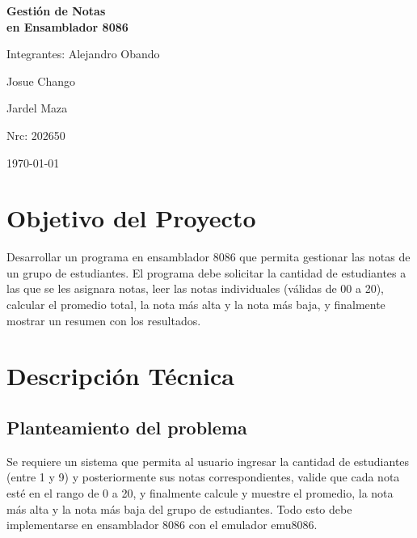 \documentclass[12pt,a4paper]{article}
\begin{document}
\begin{titlepage}
    \centering
    \vspace*{3cm}
    {\Huge \bfseries Gesti\'on de Notas\\[0.5cm]
    en Ensamblador 8086\par}
    \vspace{2cm}
    {\Large Integrantes: Alejandro Obando\par}
    {\Large                               Josue Chango\par}
    {\Large                               Jardel Maza\par}
    \vspace{1cm}
    {\Large Nrc: 202650\par}

    \vspace{2cm}
    {\large \today\par}
    \vfill
\end{titlepage}

\section{Objetivo del Proyecto}

Desarrollar un programa en ensamblador 8086 que permita gestionar las notas de un grupo de estudiantes. El programa debe solicitar la cantidad de estudiantes a las que se les asignara notas, leer las notas individuales (v\'alidas de 00 a 20), calcular el promedio total, la nota m\'as alta y la nota m\'as baja, y finalmente mostrar un resumen con los resultados.

\section{Descripci\'on T\'ecnica}

\subsection{Planteamiento del problema}

Se requiere un sistema que permita al usuario ingresar la cantidad de estudiantes (entre 1 y 9) y posteriormente sus notas correspondientes, valide que cada nota est\'e en el rango de 0 a 20, y finalmente calcule y muestre el promedio, la nota m\'as alta y la nota m\'as baja del grupo de estudiantes. Todo esto debe implementarse en ensamblador 8086 con el emulador emu8086.
\end{document}
